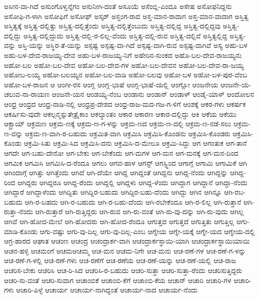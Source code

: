 ಅಸೀನ-ವಾ-ಗಿದೆ
ಅಸುಂಗೊಳ್ವನ್ನೆಗಂ
ಅಸುನೀಗಿ-ದಂತೆ
ಅಸೂಯೆ
ಅಸೆಂಬ್ಲಿ-ಎಂದೂ
ಅಸೇಷ
ಅಸೋಫನಿದ್ದನು
ಅಸೋಫಿ-ಗ-ಳಾಗಿ
ಅಸೋಫಿಗೆ
ಅಸೋಫ್
ಅಸ್ಕರ್
ಅಸ್ತಂಗ-ರಾದ
ಅಸ್ತ-ಮಾನ-ರಾದಾಗ
ಅಸ್ತ-ಮಾನ-ವಾದಾಗ
ಅಸ್ತಿತ್ವ
ಅಸ್ತಿತ್ವಕ್ಕೆ
ಅಸ್ತಿತ್ವ-ದಲ್ಲಿತ್ತು
ಅಸ್ತಿತ್ವ-ದಲ್ಲಿತ್ತೆಂದು
ಅಸ್ತಿತ್ವ-ದಲ್ಲಿತ್ತೆಂಬುದು
ಅಸ್ತಿತ್ವ-ದಲ್ಲಿದ್ದ
ಅಸ್ತಿತ್ವ-ದಲ್ಲಿದ್ದವು
ಅಸ್ತಿತ್ವ-ದಲ್ಲಿದ್ದು
ಅಸ್ತಿತ್ವ-ದಲ್ಲಿದ್ದುದು
ಅಸ್ತಿತ್ವ-ದಲ್ಲಿ-ರ-ಲಿಲ್ಲ-ವೆಂದು
ಅಸ್ತಿತ್ವ-ದಲ್ಲಿ-ರುವ
ಅಸ್ತಿತ್ವ-ದಲ್ಲಿವೆ
ಅಸ್ತಿತ್ವಲ್ಲಿದ್ದ
ಅಸ್ತಿತ್ವ-ವನ್ನು
ಅಸ್ತಿ-ಯನ್ನು
ಅಸ್ಥಿರ-ತೆ-ಯನ್ನು
ಅಸ್ಪಷ್ಟ
ಅಸ್ಪಷ್ಟ-ವಾ-ಗಿದೆ
ಅಸ್ಪಷ್ಟ-ವಾಗಿ-ರುವ
ಅಸ್ಪಷ್ಟ-ವಾಗಿವೆ
ಅಸ್ಯ
ಅಹು-ಬಳ
ಅಹು-ಬಳ-ದೇವ-ರಾಜಯ್ಯ-ದೇವ
ಅಹು-ಬಳ-ರಾಜಯ್ಯ-ನಿಗೆ
ಅಹೇರಿನ-ಸುಂಕದ
ಅಹೊ-ಬಲ-ದೇವ-ರಾಜಯ್ಯನು
ಅಹೋ-ಬಲ
ಅಹೋ-ಬಲ-ದೇವ
ಅಹೋ-ಬಲ-ದೇವ-ಗಳ
ಅಹೋ-ಬಲ-ದೇವನ
ಅಹೋ-ಬಲ-ದೇವ-ರಾ-ಜಯ್ಯ
ಅಹೋಬ-ಲಯ್ಯ
ಅಹೋ-ಬಲಯ್ಯನ
ಅಹೋ-ಬಲ-ವಾಡಿ
ಅಹೋ-ಬಲವು
ಅಹೋ-ಬಳ
ಅಹೋ-ಬಳ-ಪುರ-ವೆಂಬ
ಅಹೋ-ಬಳ-ರಾಜನ
ಆ
ಆಂಗೀ-ರಸ
ಆಂಗ್ಲ
ಆಂಗ್ಲ-ಭಾಷೆ
ಆಂಗ್ಲ-ಭಾಷೆ-ಯಲ್ಲಿ
ಆಂಗ್ಲೋ
ಆಂಜನೇಯ
ಆಂಜನೇ-ಯ-ಚಲುವ-ನಾ-ರಾಯಣ
ಆಂಜನೇ-ಯನ
ಆಂಡಯ್ಯ-ನೆಂಬ
ಆಂಡಾನು
ಆಂಡಾನ್
ಆಂಡಾಳ್
ಆಂಡೈ-ಯಾಳ್
ಆಂದೋಲನ
ಆಂಧ್ರ
ಆಂಧ್ರದ
ಆಂಧ್ರ-ನಾಡಿ-ನಲ್ಲಿ
ಆಂಧ್ರಪ್ರ-ದೇಶದ
ಆಂಧ್ರ-ರಾಜ-ಮದ-ಗಜ-ಗ-ಳಿಗೆ
ಆಂಶಕ್ಕೆ
ಆಕರ-ಗಳು
ಆಕರ್ಷಕ
ಆಕರ್ಷಿಸು-ವುದೇ
ಆಕಲ್ಪನ್ಮಸ್ನುತೇತ್ರೈಕಾಂ
ಆಕಲ್ಯಾಂತಂ
ಆಕಾರ
ಆಕಾರಣ
ಆಕಾರ-ದಲ್ಲಿದ್ದು
ಆಕಿ
ಆಕೆಯ
ಆಕೆಯು
ಆಕ್ಟ್ರಾಯ್
ಆಕ್ರಮಣ
ಆಕ್ರಮ-ಣಕ್ಕೆ
ಆಕ್ರಮ-ಣ-ಗ-ಳನ್ನು
ಆಕ್ರಮ-ಣದ
ಆಕ್ರಮ-ಣ-ದಲ್ಲಿ
ಆಕ್ರಮ-ಣ-ನಡೆ-ಸಲು
ಆಕ್ರಮ-ಣ-ವನ್ನು
ಆಕ್ರಮ-ಣ-ವಾಗಿ-ರ-ಬಹುದು
ಆಕ್ರಮಿತ-ವಾಗಿ
ಆಕ್ರಮಿಸಿ
ಆಕ್ರಮಿಸಿ-ಕೊಂಡನು
ಆಕ್ರಮಿಸಿ-ಕೊಂಡರು
ಆಕ್ರಮಿಸಿ-ಕೊಂಡು
ಆಕ್ರಮಿ-ಸಿತು
ಆಕ್ರಮಿ-ಸಿದ
ಆಕ್ರಮಿಸಿ-ದನು
ಆಕ್ರಮಿಸಿ-ದ-ಮೇಲೂ
ಆಕ್ರಮಿ-ಸಿದ್ದು
ಆಗ
ಆಗಂತುಕ
ಆಗ-ತಾನೆ
ಆಗದೇ
ಆಗ-ಬಹು-ದೇನೋ
ಆಗ-ಬೇಕು
ಆಗ-ಬೇಕೆಂದು
ಆಗ-ಮಗಳ
ಆಗ-ಮನ
ಆಗ-ಮನಕ್ಕೆ
ಆಗ-ಮನ-ದಿಂದ
ಆಗಮಿಕ
ಆಗಮಿಸಿ
ಆಗಮಿಸಿ-ದ-ರೆಂದೂ
ಆಗಲು
ಆಗವ-ಹಾಳ
ಆಗಸ್ಟ್
ಆಗಸ್ಟ್ನಿಂದ
ಆಗಾಗ್ಗೆ
ಆಗಾಮಿ
ಆಗಾಮಿಕೆ
ಆಗಿ
ಆಗಿಂದಾಗ್ಗೆ
ಆಗಿತ್ತು
ಆಗಿತ್ತೆಂದು
ಆಗಿದೆ
ಆಗಿ-ದೆಯೇ
ಆಗಿದ್ದ
ಆಗಿದ್ದಂತೆ
ಆಗಿದ್ದನು
ಆಗಿದ್ದ-ನೆಂದು
ಆಗಿದ್ದನ್ನು
ಆಗಿದ್ದ-ರಿಂದ
ಆಗಿದ್ದರು
ಆಗಿದ್ದರೂ
ಆಗಿದ್ದ-ರೆಂದು
ಆಗಿದ್ದಲ್ಲಿ
ಆಗಿದ್ದಳು
ಆಗಿದ್ದ-ಳೆಂದು
ಆಗಿದ್ದಾಗ
ಆಗಿದ್ದಾನೆ
ಆಗಿದ್ದಾ-ನೆಂದು
ಆಗಿದ್ದಾರೆ
ಆಗಿದ್ದಾಳೆಂದು
ಆಗಿದ್ದಿತು
ಆಗಿದ್ದಿರ-ಬಹುದು
ಆಗಿದ್ದಿರ-ಬಹು-ದೆಂದು
ಆಗಿದ್ದು
ಆಗಿನ
ಆಗಿನ್ನೂ
ಆಗಿ-ರಬ-ಬಹುದು
ಆಗಿ-ರ-ಬಹದು
ಆಗಿ-ರ-ಬಹುದು
ಆಗಿ-ರ-ಬಹು-ದೆಂದು
ಆಗಿ-ರಬೇಕೆಂದೂ
ಆಗಿ-ರ-ಲಿಲ್ಲ
ಆಗಿ-ರುತ್ತಾನೆ
ಆಗಿ-ರುತ್ತಾ-ನೆಂದು
ಆಗಿ-ರುತ್ತಾರೆ
ಆಗಿ-ರುತ್ತಿದ್ದರು
ಆಗಿ-ರುವ
ಆಗಿ-ರು-ವಂತೆ
ಆಗಿ-ರು-ವು-ದನ್ನು
ಆಗಿ-ರು-ವುದು
ಆಗಿಲ್ಲ
ಆಗಿವೆ
ಆಗಿ-ಹೋದ-ಮೇಲೆ
ಆಗಿ-ಹೋದರು
ಆಗಿ-ಹೋದ-ರೆಂದೂ
ಆಗುತ್ತದ
ಆಗುತ್ತದೆ
ಆಗುತ್ತಿತು
ಆಗುತ್ತಿಲ್ಲ
ಆಗು-ಮಾಡಿ-ಕೊಂಡು
ಆಗು-ವಷ್ಟು
ಆಗು-ವು-ದಿಲ್ಲ
ಆಗು-ವು-ದಿಲ್ಲ-ಎಂಬ
ಆಗ್ನೇಯ
ಆಗ್ನೇ-ಯಕ್ಕೆ
ಆಗ್ನೇ-ಯದ
ಆಗ್ನೇಯ-ದಲ್ಲಿ
ಆಗ್ರ-ಹಾರದ
ಆಘಾತ
ಆಚಂಣ
ಆಚಂದ್ರ
ಆಚಂದ್ರಾರ್ಕ-ವಾಗಿ
ಆಚಂದ್ರಾರ್ಕಸ್ಥಾಯಿ-ಯಾಗಿ
ಆಚಂದ್ರಾರ್ಕಸ್ಥಾಯಿಯಾಯಿ
ಆಚನ-ಹಳ್ಳಿ
ಆಚಮಂಗೆ
ಆಚಮಆಚಮ್ಮ
ಆಚ-ಮನ
ಆಚಮ-ನಿಗೇ
ಆಚ-ಮನು
ಆಚ-ರಣೆ-ಗಳ
ಆಚ-ರಣೆ-ಗ-ಳನ್ನು
ಆಚ-ರಣೆ-ಗ-ಳಲ್ಲಿ
ಆಚ-ರಣೆ-ಗಳು
ಆಚ-ರಣೆಗೆ
ಆಚ-ರಣೆಯ
ಆಚ-ರಣೆ-ಯನ್ನು
ಆಚ-ರಣೆ-ಯಲ್ಲಿ
ಆಚ-ರಾಜ
ಆಚರಿಸ-ಬೇಕು
ಆಚರಿಸಿ
ಆಚ-ರಿ-ಸಿದ
ಆಚರಿಸಿ-ರ-ಬಹುದು
ಆಚರಿ-ಸುತ್ತಾ
ಆಚರಿ-ಸುತ್ತಾ-ರೆಂದು
ಆಚರಿಸುತ್ತಿದ್ದರು
ಆಚರಿ-ಸು-ವಂತೆ
ಆಚರಿ-ಸುವಾಗ
ಆಚಾಂಬಿಕೆ
ಆಚಾಂಬಿ-ಕೆಗೆ
ಆಚಾಂಬಿ-ಕೆಯ
ಆಚಾನ್
ಆಚಾರಿ
ಆಚಾರಿ-ಗಳ
ಆಚಾರಿ-ಗಳು
ಆಚಾರಿ-ಪಿಳ್ಳೆ
ಆಚಾರ್ಯ
ಆಚಾರ್ಯ-ನಾಗಿದ್ದಂತೆ
ಆಚಾರ್ಯ-ನಾದ
ಆಚಾರ್ಯ-ನೆಂದು
